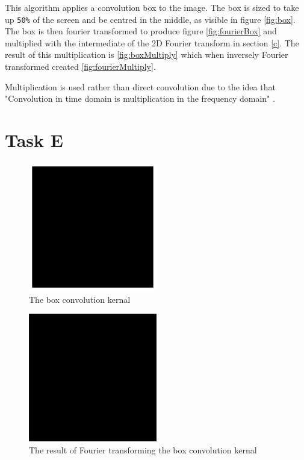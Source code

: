 \documentclass{article}
\begin{document}
This algorithm applies a convolution box to the image. The box is sized to take up \verb|50%| of the screen and be centred in the middle, as visible in figure \ref{fig:box}. The box is then fourier transformed to produce figure \ref{fig:fourierBox} and multiplied with the intermediate of the 2D Fourier transform in section \ref{c}. The result of this multiplication is \ref{fig:boxMultiply} which when inversely Fourier transformed created \ref{fig:fourierMultiply}.

Multiplication is used rather than direct convolution due to the idea that "Convolution in time domain is multiplication in the frequency domain" \parencite{ian1}.

\section{Task E} \label{e}


\begin{figure}[H]
    \centering
    \caption{The box convolution kernal}
    \label{fig:box2}
    \includegraphics[width=0.5\textwidth]{rect_image2.png}
\end{figure}

\begin{figure}[H]
    \centering
    \caption{The result of Fourier transforming the box convolution kernal}
    \label{fig:fourierBox2}
    \includegraphics[width=0.5\textwidth]{fourier_rect_image2.png}
\end{figure}
\end{document}
